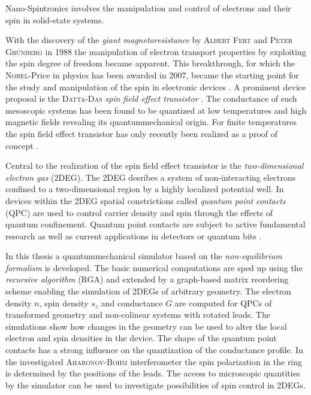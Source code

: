 Nano-Spintronics involves the manipulation and control of electrons and their spin in solid-state systems.\par
With the discovery of the \emph{giant magnetoresistance} by \textsc{Albert Fert} and \textsc{Peter Gr\"unberg} in 1988 the manipulation of electron transport properties by exploiting the spin degree of freedom became apparent. This breakthrough, for which the \textsc{Nobel}-Price in physics has been awarded in 2007, became the starting point for the study and manipulation of the spin in electronic devices \cite{evegeny2010spin}. A prominent device proposal is the \textsc{Datta-Das} \emph{spin field effect transistor} \cite{datta:665}. The conductance of such mesoscopic systems has been found to be quantized \cite{PhysRevLett.45.494} at low temperatures and high magnetic fields revealing its quantummechanical origin. For finite temperatures the spin field effect transistor has only recently been realized as a proof of concept \cite{Wunderlich24122010}.\par
Central to the realization of the spin field effect transistor is the \emph{two-dimensional electron gas} (2DEG). The 2DEG desribes a system of non-interacting electrons confined to a two-dimensional region by a highly localized potential well. In devices within the 2DEG spatial constrictions called \emph{quantum point contacts} (QPC) are used to control carrier density and spin through the effects of quantum confinement. Quantum point contacts are subject to active fundamental research as well as current applications in detectors \cite{PhysRevB.67.161308} or quantum bits \cite{PhysRevA.57.120}.\par
In this thesis a quantummechanical simulator based on the \emph{non-equilibrium \gfnc{} formalism} is developed. The basic numerical computations are sped up using the \emph{recursive \gfnc{} algorithm} (RGA) and extended by a graph-based matrix reordering scheme enabling the simulation of 2DEGs of arbitrary geometry.
The electron density $n$, spin density $s_z$ and conductance $G$ are computed for QPCs of transformed geometry and non-colinear systems with rotated leads. The simulations show how changes in the geometry can be used to alter the local electron and spin densities in the device.
The shape of the quantum point contacts has a strong influence on the quantization of the conductance profile. In the investigated \textsc{Aharonov-Bohm} interferometer the spin polarization in the ring is determined by the positions of the leads. The access to microscopic quantities by the simulator can be used to investigate possibilities of spin control in 2DEGs.
